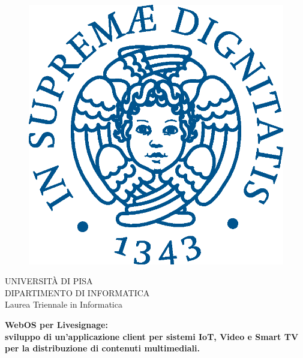 \begin{titlepage}
\begin{figure}[!htb]
    \centering
    \includegraphics[keepaspectratio=true,scale=0.5]{images/Frontespizio/cherubinFrontespizio.eps}
\end{figure}

\begin{center}
    \LARGE{UNIVERSITÀ DI PISA}
    \vspace{5mm}
    \\ \large{DIPARTIMENTO DI INFORMATICA}
    \vspace{5mm}
    \\ \LARGE{Laurea Triennale in Informatica}
\end{center}

\vspace{15mm}
\begin{center}
    {\LARGE{\bf WebOS per Livesignage:\\ \vspace{5mm} 
    sviluppo di un'applicazione client per sistemi IoT, Video e Smart TV per la distribuzione di contenuti multimediali.
    }}
\end{center}
\vspace{10mm}


\end{titlepage}
